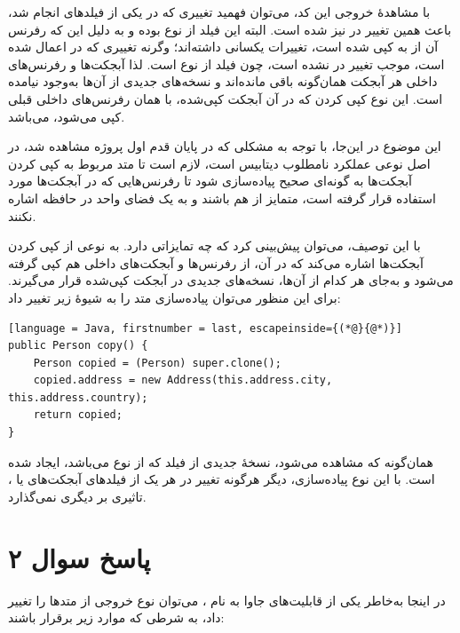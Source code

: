 \documentclass{article}
\begin{document}
با مشاهدۀ خروجی این کد، می‌توان فهمید تغییری که در یکی از فیلدهای  انجام شد، باعث همین تغییر در  نیز شده است. البته این فیلد از نوع  بوده و به دلیل این که رفرنس آن از  به  کپی شده است، تغییرات یکسانی داشته‌اند؛ وگرنه تغییری که در  اعمال شده است، موجب تغییر در  نشده است، چون فیلد  از نوع  است. لذا آبجکت‌ها و رفرنس‌های داخلی هر آبجکت همان‌گونه باقی مانده‌اند و نسخه‌های جدیدی از آن‌ها به‌وجود نیامده است. این نوع کپی کردن که در آن آبجکت کپی‌شده، با همان رفرنس‌های داخلی قبلی کپی می‌شود،  می‌باشد.

این موضوع در این‌جا، با توجه به مشکلی که در پایان قدم اول پروژه مشاهده شد، در اصل نوعی عملکرد نامطلوب دیتابیس است، لازم است تا متد مربوط به کپی کردن آبجکت‌ها به گونه‌ای صحیح پیاده‌سازی شود تا رفرنس‌هایی که در آبجکت‌ها مورد استفاده قرار گرفته است، متمایز از هم باشند و به یک فضای واحد در حافظه اشاره نکنند.

با این توصیف، می‌توان پیش‌بینی کرد که  چه تمایزاتی دارد.  به نوعی از کپی کردن آبجکت‌ها اشاره می‌کند که در آن، از رفرنس‌ها و آبجکت‌های داخلی هم کپی گرفته می‌شود و به‌جای هر کدام از آن‌ها، نسخه‌های جدیدی در آبجکت کپی‌شده قرار می‌گیرند. برای این منظور می‌توان پیاده‌سازی متد  را به شیوۀ زیر تغییر داد:

\begin{latin}
\begin{lstlisting}[language = Java, firstnumber = last, escapeinside={(*@}{@*)}]
public Person copy() {
    Person copied = (Person) super.clone();
    copied.address = new Address(this.address.city, this.address.country);
    return copied;
}
\end{lstlisting}
\end{latin}

همان‌گونه که مشاهده می‌شود، نسخۀ جدیدی از فیلد  که از نوع  می‌باشد، ایجاد شده است. با این نوع پیاده‌سازی، دیگر هرگونه تغییر در هر یک از فیلدهای آبجکت‌های  یا ، تاثیری بر دیگری نمی‌گذارد.

\section*{پاسخ سوال ۲}

در اینجا به‌خاطر یکی از قابلیت‌های جاوا به نام ، می‌توان نوع خروجی از متد‌ها را تغییر داد، به شرطی که موارد زیر برقرار باشند:
\end{document}
